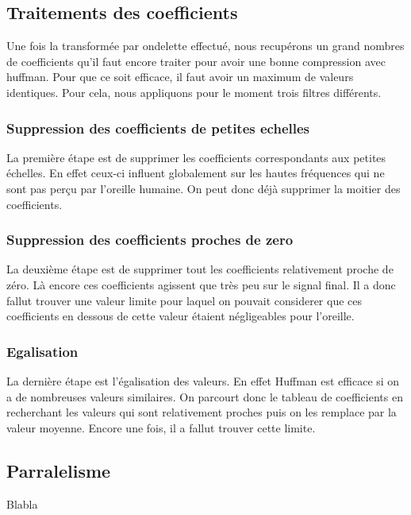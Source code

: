 \documentclass[a4paper,12pt]{article}
\begin{document}
\subsection{Traitements des coefficients}
Une fois la transformée par ondelette effectué, nous recupérons un
grand nombres de coefficients qu'il faut encore traiter pour avoir une
bonne compression avec huffman. Pour que ce soit efficace, il faut
avoir un maximum de valeurs identiques. Pour cela, nous appliquons
pour le moment trois filtres différents.
\subsubsection{Suppression des coefficients de petites echelles}
La première étape est de supprimer les coefficients correspondants aux
petites échelles. En effet ceux-ci influent globalement sur les hautes
fréquences qui ne sont pas perçu par l'oreille humaine. On peut donc
déjà supprimer la moitier des coefficients.
\subsubsection{Suppression des coefficients proches de zero}
La deuxième étape est de supprimer tout les coefficients relativement
proche de zéro. Là encore ces coefficients agissent que très peu sur
le signal final. Il a donc fallut trouver une valeur limite pour
laquel on pouvait considerer que ces coefficients en dessous de cette
valeur étaient négligeables pour l'oreille.
\subsubsection{Egalisation}
La dernière étape est l'égalisation des valeurs. En effet Huffman est
efficace si on a de nombreuses valeurs similaires. On parcourt donc le
tableau de coefficients en recherchant les valeurs qui sont
relativement proches puis on les remplace par la valeur
moyenne. Encore une fois, il a fallut trouver cette limite.
	\subsection{Parralelisme}
Blabla
\end{document}
